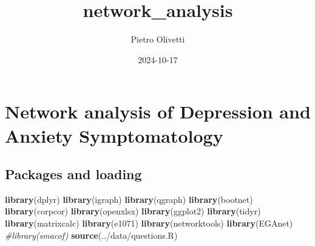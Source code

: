 \documentclass[
]{article}
\title{network\_analysis}
\author{Pietro Olivetti}
\date{2024-10-17}
\newenvironment{Shaded}{\begin{snugshade}}{\end{snugshade}}
\newcommand{\CommentTok}[1]{\textcolor[rgb]{0.56,0.35,0.01}{\textit{#1}}}
\newcommand{\FunctionTok}[1]{\textcolor[rgb]{0.13,0.29,0.53}{\textbf{#1}}}
\newcommand{\NormalTok}[1]{#1}
\newcommand{\StringTok}[1]{\textcolor[rgb]{0.31,0.60,0.02}{#1}}
\begin{document}
\maketitle

\section{Network analysis of Depression and Anxiety
Symptomatology}\label{network-analysis-of-depression-and-anxiety-symptomatology}

\subsection{Packages and loading}\label{packages-and-loading}

\begin{Shaded}
\begin{Highlighting}[]
\FunctionTok{library}\NormalTok{(dplyr)}
\FunctionTok{library}\NormalTok{(igraph)}
\FunctionTok{library}\NormalTok{(qgraph)}
\FunctionTok{library}\NormalTok{(bootnet)}
\FunctionTok{library}\NormalTok{(corpcor)}
\FunctionTok{library}\NormalTok{(openxlsx)}
\FunctionTok{library}\NormalTok{(ggplot2)}
\FunctionTok{library}\NormalTok{(tidyr)}
\FunctionTok{library}\NormalTok{(matrixcalc)}
\FunctionTok{library}\NormalTok{(e1071)}
\FunctionTok{library}\NormalTok{(networktools)}
\FunctionTok{library}\NormalTok{(EGAnet)}
\CommentTok{\#library(smacof)}
\FunctionTok{source}\NormalTok{(}\StringTok{\textquotesingle{}../data/questions.R\textquotesingle{}}\NormalTok{)}
\end{Highlighting}
\end{Shaded}
\end{document}
